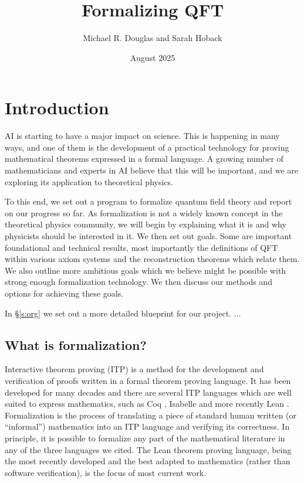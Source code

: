 \documentclass{article}
\title{Formalizing QFT}
\date{August 2025}
\author{Michael R. Douglas and Sarah Hoback}
\begin{document}
\maketitle{}

\begin{abstract}
\end{abstract}
\vfill\eject

\iffalse\tableofcontents\fi

\newpage

\section{Introduction}
\label{s:intro}

AI is starting to have a major impact on science.  This is happening in many ways, and one of them is the development of a practical technology for proving mathematical theorems expressed in a formal language.  A growing number of mathematicians and experts in AI believe that this will be important, and we are exploring its application to theoretical physics.

To this end, we set out a program to formalize quantum field theory and report on our progress so far.  As formalization is not a widely known concept in the theoretical physics community, we will begin by explaining what it is and why physicists should be interested in it.  We then set out goals.  Some are important foundational and technical results, most importantly the definitions of QFT within various axiom systems and the reconstruction theorems which relate them.  We also outline more ambitious goals which we believe might be possible with strong enough formalization technology.
We then discuss our methods and options for achieving these goals.

In \S \ref{s:org} we set out a more detailed blueprint for our project. ...

\subsection{What is formalization?}
Interactive theorem proving (ITP) is a method for the development and verification of proofs written in a formal theorem proving language.  It has been developed for many decades and there are several ITP languages which are well suited to express mathematics, such as Coq \cite{}, Isabelle \cite{} and more recently Lean \cite{}.  Formalization is the process of translating a piece of standard human written (or ``informal'') mathematics into an ITP language and verifying its correctness.  In principle, it is possible to formalize any part of the mathematical literature in any of the three languages we cited.  The Lean theorem proving language, being the most recently developed and the best adapted to mathematics (rather than software verification), is the focus of most current work.  
\end{document}
